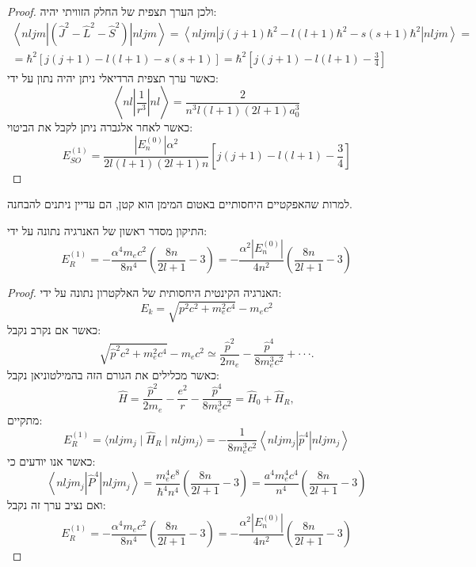 \documentclass{tstextbook}
\begin{document}
\begin{proof}
ולכן הערך תצפית של החלק הזוויתי יהיה:
$$\begin{gather}\left\langle n l j m\left|\left( \hat{J}^{2}-\hat{L}^{2}-\hat{S}^{2} \right)\right|n l j m\right\rangle=\left\langle  n l j m|j(j+1)\hbar^{2}-l(l+1)\hbar^{2}-s(s+1)\hbar^{2}|n l j m \right\rangle =\\=\hbar^{2}[j(j+1)-l(l+1)-s(s+1)]=\hbar^{2}\left[ j(j+1)-l(l+1)-\frac{3}{4} \right] 
\end{gather}$$
כאשר ערך תצפית הרדיאלי ניתן יהיה נתון על ידי:
$$\left\langle n l\left|\frac{1}{r^{3}}\right|n l\right\rangle=\frac{2}{n^{3}l(l+1)(2l+1)a_{0}^{3}}$$
כאשר לאחר אלגברה ניתן לקבל את הביטוי:
$$E_{S O}^{(1)}=\frac{|E_{n}^{(0)}|\alpha^{2}}{2l(l+1)(2l+1)n}\left[j(j+1)-l(l+1)-\frac{3}{4}\right]$$

\end{proof}
\begin{definition}
למרות שהאפקטיים היחסותיים באטום המימן הוא קטן, הם עדיין ניתנים להבחנה.

\end{definition}
\begin{proposition}
התיקון מסדר ראשון של האנרגיה נתונה על ידי:
$$E_{R}^{(1)}=-\frac{\alpha^{4}m_{e}c^{2}}{8n^{4}}\left(\frac{8n}{2l+1}-3\right)=-\frac{\alpha^{2}|E_{n}^{(0)}|}{4n^{2}}\left(\frac{8n}{2l+1}-3\right)$$

\end{proposition}
\begin{proof}
האנרגיה הקינטית היחסותית של האלקטרון נתונה על ידי:
$$E_{k}=\sqrt{ p^{2}c^{2}+m_{e}^{2}c^{4} }-m_{e}c^{2}$$
כאשר אם נקרב נקבל:
$$\sqrt{\hat{p}^{2}c^{2}+m_{e}^{2}c^{4}}-m_{e}c^{2}\simeq\frac{\hat{p}^{2}}{2m_{e}}-\frac{\hat{p}^{4}}{8m_{e}^{3}c^{2}}+\cdot\cdot\cdot.$$
כאשר מכלילים את הגורם הזה בהמילטוניאן נקבל:
$$\hat{H}=\frac{\hat{p}^{2}}{2m_{e}}-\frac{e^{2}}{r}-\frac{\hat{p}^{4}}{8m_{e}^{3}c^{2}}=\hat{H}_{0}+\hat{H}_{R},$$
מתקיים:
$$E_{R}^{(1)}=\langle n l j m_{j}\mid\hat{H}_{R}\mid n l j m_{j}\rangle=-\frac{1}{8m_{e}^{3}c^{2}}\left\langle n l j m_{j}\left|\hat{p}^{4}\right|n l j m_{j}\right\rangle$$
כאשר אנו יודעים כי:
$$\left\langle n l j m_{j}\left|\hat{P}^{4}\right|n l j m_{j}\right\rangle=\frac{m_{e}^{4}e^{8}}{\hbar^{4}n^{4}}\left(\frac{8n}{2l+1}-3\right)=\frac{a^{4}m_{e}^{4}c^{4}}{n^{4}}\left(\frac{8n}{2l+1}-3\right)$$
ואם נציב ערך זה נקבל:
$$E_{R}^{(1)}=-\frac{\alpha^{4}m_{e}c^{2}}{8n^{4}}\left(\frac{8n}{2l+1}-3\right)=-\frac{\alpha^{2}|E_{n}^{(0)}|}{4n^{2}}\left(\frac{8n}{2l+1}-3\right)$$

\end{proof}
\end{document}
